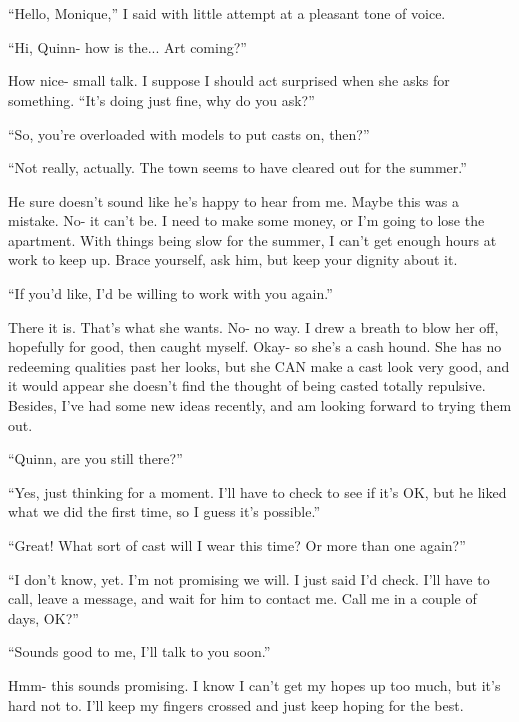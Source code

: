\chapter{~}
``Hello, Monique,'' I said with little attempt at a pleasant tone of voice.

``Hi, Quinn- how is the... Art coming?''

How nice- small talk. I suppose I should act surprised when she asks for something. ``It's
doing just fine, why do you ask?''

``So, you're overloaded with models to put casts on, then?''

``Not really, actually. The town seems to have cleared out for the summer.''

\begin{thought}
He sure doesn't sound like he's happy to hear from me. Maybe this was a mistake. No- it
can't be. I need to make some money, or I'm going to lose the apartment. With things being slow
for the summer, I can't get enough hours at work to keep up. Brace yourself, ask him, but keep
your dignity about it.
\end{thought}

``If you'd like, I'd be willing to work with you again.''

There it is. That's what she wants. No- no way. I drew a breath to blow her off, hopefully
for good, then caught myself. Okay- so she's a cash hound. She has no redeeming qualities past
her looks, but she CAN make a cast look very good, and it would appear she doesn't find the
thought of being casted totally repulsive. Besides, I've had some new ideas recently, and am
looking forward to trying them out.

``Quinn, are you still there?''

``Yes, just thinking for a moment. I'll have to check to see if it's OK, but he liked what we
did the first time, so I guess it's possible.''

``Great! What sort of cast will I wear this time? Or more than one again?''

``I don't know, yet. I'm not promising we will. I just said I'd check. I'll have to call,
leave a message, and wait for him to contact me. Call me in a couple of days, OK?''

``Sounds good to me, I'll talk to you soon.''

\begin{thought}
Hmm- this sounds promising. I know I can't get my hopes up too much, but it's hard not to.
I'll keep my fingers crossed and just keep hoping for the best.
\end{thought}

